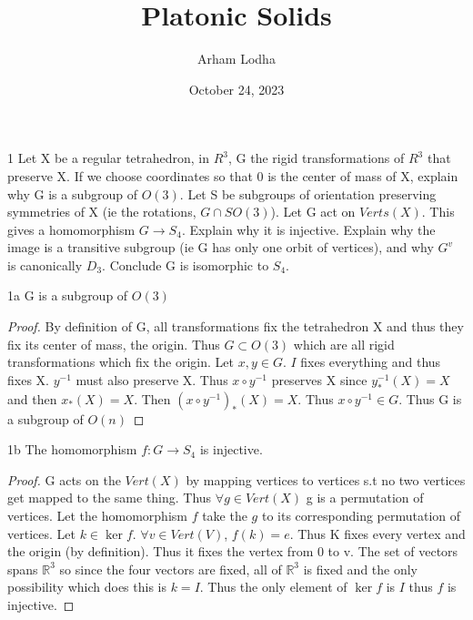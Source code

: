 \documentclass{article}
\newcommand{\R}{\mathbb{R}}
\begin{document}
\title{Platonic Solids}
\author{Arham Lodha}%
\date{October 24, 2023}%
\maketitle

\begin{PROB}{1}\label{Problem 1.}
    Let X be a regular tetrahedron, in $R^3$, G the rigid transformations of $R^3$ that preserve X. If we choose coordinates so that 0 is the center of mass of X, explain why G is a subgroup of $O(3)$. Let S be subgroups of orientation preserving symmetries of X (ie the rotations, $G \cap SO(3)$). Let G act on $Verts(X)$. This gives a homomorphism $G \to S_4$. Explain why it is injective. Explain why the image is a transitive subgroup (ie G has only one orbit of vertices), and why $G^v$ is canonically $D_3$. Conclude G is isomorphic to $S_4$.
\end{PROB}
\begin{claim}{1a}
    G is a subgroup of $O(3)$
\end{claim}
\begin{proof}
    By definition of G, all transformations fix the tetrahedron X and thus they fix its center of mass, the origin. Thus $G \subset O(3)$ which are all rigid transformations which fix the origin. Let $x, y \in G$. $I$ fixes everything and thus fixes X. $y^{-1}$ must also preserve X. Thus $x \circ y^{-1}$ preserves X since $y^{-1}_*(X) = X$ and then $x_*(X) = X$. Then $(x \circ y^{-1})_*(X) = X$. Thus $x \circ y^{-1} \in G$. Thus G is a subgroup of $O(n)$
\end{proof}

\begin{claim}{1b}
    The homomorphism $f: G \to S_4$ is injective.
\end{claim}
\begin{proof}
    G acts on the $Vert(X)$ by mapping vertices to vertices s.t no two vertices get mapped to the same thing. Thus $\forall g \in Vert(X)$ g is a permutation of vertices. Let the homomorphism $f$ take the $g$ to its corresponding permutation of vertices. Let $k \in \ker f$. $\forall v \in Vert(V)$, $f(k) = e$. Thus K fixes every vertex and the origin (by definition). Thus it fixes the vertex from 0 to v. The set of vectors spans $\R^3$ so since the four vectors are fixed, all of $\R^3$ is fixed and the only possibility which does this is $k = I$. Thus the only element of $\ker f$ is $I$ thus $f$ is injective.
\end{proof}
\end{document}
